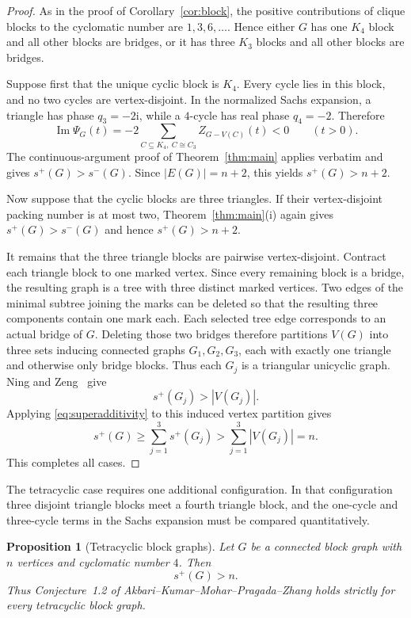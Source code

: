 \documentclass[11pt]{article}
\newtheorem{proposition}[theorem]{Proposition}
\theoremstyle{definition}
\theoremstyle{remark}
\newcommand{\ii}{\mathrm{i}}
\begin{document}
\begin{proof}
As in the proof of Corollary~\ref{cor:block}, the positive contributions of
clique blocks to the cyclomatic number are $1,3,6,\ldots$.  Hence either $G$
has one $K_4$ block and all other blocks are bridges, or it has three $K_3$
blocks and all other blocks are bridges.

Suppose first that the unique cyclic block is $K_4$.  Every cycle lies in
this block, and no two cycles are vertex-disjoint.  In the normalized Sachs
expansion, a triangle has phase $q_3=-2\ii$, while a $4$-cycle has real phase
$q_4=-2$.  Therefore
\[
 \operatorname{Im}\Psi_G(t)
 =-2\sum_{C\subseteq K_4,\ C\cong C_3}Z_{G-V(C)}(t)<0
 \qquad(t>0).
\]
The continuous-argument proof of Theorem~\ref{thm:main} applies verbatim and
gives $s^+(G)>s^-(G)$.  Since $|E(G)|=n+2$, this yields
$s^+(G)>n+2$.

Now suppose that the cyclic blocks are three triangles.  If their
vertex-disjoint packing number is at most two, Theorem~\ref{thm:main}(i)
again gives $s^+(G)>s^-(G)$ and hence $s^+(G)>n+2$.

It remains that the three triangle blocks are pairwise vertex-disjoint.
Contract each triangle block to one marked vertex.  Since every remaining
block is a bridge, the resulting graph is a tree with three distinct marked
vertices.  Two edges of the minimal subtree joining the marks can be deleted
so that the resulting three components contain one mark each.  Each selected
tree edge corresponds to an actual bridge of $G$.  Deleting those two bridges
therefore partitions $V(G)$ into three sets inducing connected graphs
$G_1,G_2,G_3$, each with exactly one triangle and otherwise only bridge
blocks.  Thus each $G_j$ is a triangular unicyclic graph.  Ning and
Zeng~\cite{NingZeng} give
\[
 s^+(G_j)>|V(G_j)|.
\]
Applying \eqref{eq:superadditivity} to this induced vertex partition gives
\[
 s^+(G)\ge\sum_{j=1}^3s^+(G_j)
 >\sum_{j=1}^3|V(G_j)|=n.
\]
This completes all cases.
\end{proof}

The tetracyclic case requires one additional configuration.  In that
configuration three disjoint triangle blocks meet a fourth triangle block,
and the one-cycle and three-cycle terms in the Sachs expansion must be
compared quantitatively.

\begin{proposition}[Tetracyclic block graphs]\label{prop:tetracyclic-block}
Let $G$ be a connected block graph with $n$ vertices and cyclomatic number
$4$.  Then
\[
 s^+(G)>n.
\]
Thus Conjecture~1.2 of Akbari--Kumar--Mohar--Pragada--Zhang holds strictly
for every tetracyclic block graph.
\end{proposition}
\end{document}
